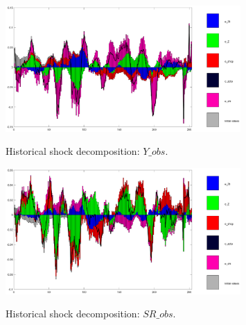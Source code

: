  
\begin{figure}[H]
\centering 
\includegraphics[width=0.8\textwidth]{directed_search/graphs/directed_search_shock_decomposition_Y_obs}
\label{Fig:shock_decomp:Y_obs}
\caption{Historical shock decomposition: $ Y\_obs $.}
\end{figure}
 
\begin{figure}[H]
\centering 
\includegraphics[width=0.8\textwidth]{directed_search/graphs/directed_search_shock_decomposition_SR_obs}
\label{Fig:shock_decomp:SR_obs}
\caption{Historical shock decomposition: $ SR\_obs $.}
\end{figure}
 
 
